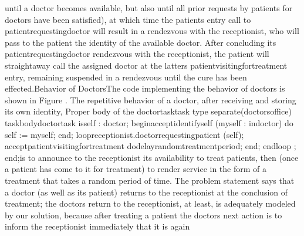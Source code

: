 until a doctor becomes available, but also until all prior requests
by patients for doctors have been satisfied), at which time the patient\rsquo[]s
entry call to \tyxffmxmono[]patient\Symuns[]requesting\Symuns[]doctor%
\tyxffmxendmono[] will result in a rendezvous with the receptionist,
who will pass to the patient the identity of the available doctor.
After concluding its \tyxffmxmono[]patient\Symuns[]requesting\Symuns[]doctor%
\tyxffmxendmono[] rendezvous with the receptionist, the patient will
straightaway call the assigned doctor at the latter\rsquo[]s %
\tyxffmxmono[]patient\Symuns[]visiting\Symuns[]for\Symuns[]treatment%
\tyxffmxendmono[] entry, remaining suspended in a rendezvous until
the cure has been effected.\Endpara[]
\DivEndiv[]
\DivLiv[]\HdMinLiv[]Behavior of Doctors\HdMinEndiv[]
\Para[]The code implementing the behavior of doctors is shown in Figure
. The repetitive behavior of a
doctor, after receiving and storing its own identity,
\Parbox[]
Proper body of the %
\tyxffmxmono[]doctor\Symuns[]task\tyxffmxendmono[] task type%
\FgEndcap[]
\Comp[]\tyxtstxbf[]separate\tyxtstxendbf[] (doctors\Symuns[]office)
\tyxtstxbf[]task\tyxtstxendbf[] \tyxtstxbf[]body\tyxtstxendbf[] doctor\Symuns[]task %
\tyxtstxbf[]is\tyxtstxendbf[]
   self : doctor;
\tyxtstxbf[]begin\tyxtstxendbf[]
   \tyxtstxbf[]accept\tyxtstxendbf[] identify\Symuns[]self (myself : %
\tyxtstxbf[]in\tyxtstxendbf[] doctor) \tyxtstxbf[]do%
\tyxtstxendbf[]
      self := myself;
   \tyxtstxbf[]end\tyxtstxendbf[];
   \tyxtstxbf[]loop\tyxtstxendbf[]
      receptionist.doctor\Symuns[]requesting\Symuns[]patient (self);
      \tyxtstxbf[]accept\tyxtstxendbf[] patient\Symuns[]visiting\Symuns[]for\Symuns[]treatment %
\tyxtstxbf[]do\tyxtstxendbf[]
         \tyxtstxbf[]delay\tyxtstxendbf[] random\Symuns[]treatment\Symuns[]period;
      \tyxtstxbf[]end\tyxtstxendbf[];
   \tyxtstxbf[]end\tyxtstxendbf[] \tyxtstxbf[]loop%
\tyxtstxendbf[];
\tyxtstxbf[]end\tyxtstxendbf[];\Endcomp[]
\EndParbox[]
\FgEndblock[]
 is to announce to the receptionist its availability to treat patients,
then (once a patient has come to it for treatment) to render service
in the form of a treatment that takes a random period of time. The
problem statement says that a doctor (as well as its patient) returns
to the receptionist at the conclusion of treatment; the doctor\rsquo[]s
return to the receptionist, at least, is adequately modeled by our
solution, because after treating a patient the doctor\rsquo[]s next
action is to inform the receptionist immediately that it is again
